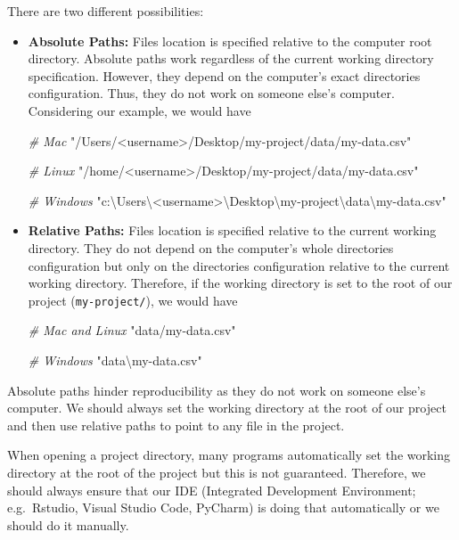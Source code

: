 \documentclass[
  11pt,
]{book}
\newenvironment{Shaded}{\begin{snugshade}}{\end{snugshade}}
\newcommand{\CommentTok}[1]{\textcolor[rgb]{0.56,0.35,0.01}{\textit{#1}}}
\newcommand{\StringTok}[1]{\textcolor[rgb]{0.31,0.60,0.02}{#1}}
\begin{document}
There are two different possibilities:

\begin{itemize}
\item
  \textbf{Absolute Paths:} Files location is specified relative to the computer root directory. Absolute paths work regardless of the current working directory specification. However, they depend on the computer's exact directories configuration. Thus, they do not work on someone else's computer. Considering our example, we would have

\begin{Shaded}
\begin{Highlighting}[]
\CommentTok{\# Mac}
\StringTok{"/Users/\textless{}username\textgreater{}/Desktop/my{-}project/data/my{-}data.csv"}

\CommentTok{\# Linux}
\StringTok{"/home/\textless{}username\textgreater{}/Desktop/my{-}project/data/my{-}data.csv"}

\CommentTok{\# Windows}
\StringTok{"c:\textbackslash{}Users\textbackslash{}\textless{}username\textgreater{}\textbackslash{}Desktop\textbackslash{}my{-}project\textbackslash{}data\textbackslash{}my{-}data.csv"}
\end{Highlighting}
\end{Shaded}
\item
  \textbf{Relative Paths:} Files location is specified relative to the current working directory. They do not depend on the computer's whole directories configuration but only on the directories configuration relative to the current working directory. Therefore, if the working directory is set to the root of our project (\texttt{my-project/}), we would have

\begin{Shaded}
\begin{Highlighting}[]
\CommentTok{\# Mac and Linux}
\StringTok{"data/my{-}data.csv"}

\CommentTok{\# Windows}
\StringTok{"data\textbackslash{}my{-}data.csv"}
\end{Highlighting}
\end{Shaded}
\end{itemize}

Absolute paths hinder reproducibility as they do not work on someone else's computer. We should always set the working directory at the root of our project and then use relative paths to point to any file in the project.

When opening a project directory, many programs automatically set the working directory at the root of the project but this is not guaranteed. Therefore, we should always ensure that our IDE (Integrated Development Environment; e.g.~Rstudio, Visual Studio Code, PyCharm) is doing that automatically or we should do it manually.
\end{document}

